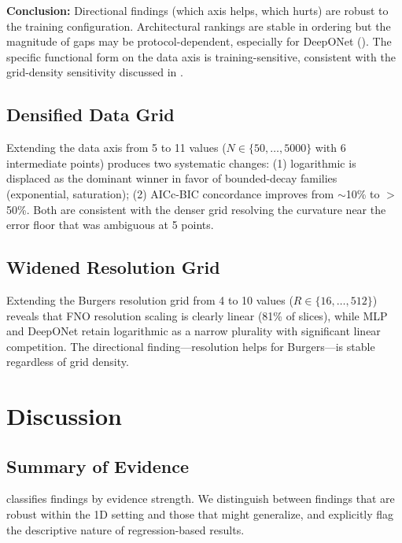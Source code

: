 \documentclass[11pt]{article}
\begin{document}
\textbf{Conclusion:} Directional findings (which axis helps, which
hurts) are robust to the training configuration. Architectural
rankings are stable in ordering but the magnitude of gaps may be
protocol-dependent, especially for DeepONet ().
The specific functional form on the data axis is training-sensitive,
consistent with the grid-density sensitivity discussed in
.

\subsection{Densified Data Grid}
\label{sec:dense-n}

Extending the data axis from 5 to 11 values
($N \in \{50, \ldots, 5000\}$ with 6 intermediate points) produces
two systematic changes: (1) logarithmic is displaced as the dominant
winner in favor of bounded-decay families (exponential, saturation);
(2) AICc-BIC concordance improves from $\sim$10\% to $>$50\%.
Both are consistent with the denser grid resolving the curvature
near the error floor that was ambiguous at 5 points.

\subsection{Widened Resolution Grid}
\label{sec:wide-r}

Extending the Burgers resolution grid from 4 to 10 values
($R \in \{16, \ldots, 512\}$) reveals that FNO resolution scaling
is clearly linear (81\% of slices), while MLP and DeepONet retain
logarithmic as a narrow plurality with significant linear
competition. The directional finding---resolution helps for
Burgers---is stable regardless of grid density.


\section{Discussion}
\label{sec:discussion}

\subsection{Summary of Evidence}

 classifies findings by evidence strength.
We distinguish between findings that are robust within the 1D setting
and those that might generalize, and explicitly flag the
descriptive nature of regression-based results.
\end{document}
